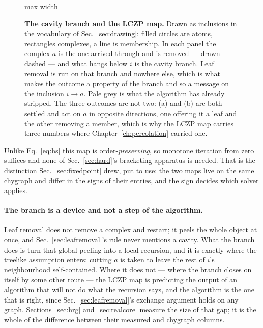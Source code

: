 \begin{figure}[t]
\begin{adjustbox}{max width=\linewidth}
\end{adjustbox}
\caption{\textbf{The cavity branch and the LCZP map.} Drawn
as inclusions in the vocabulary of Sec.~\ref{sec:drawing}: filled circles are
atoms, rectangles complexes, a line is membership. In each panel the complex
$a$ is the one arrived through and is removed --- drawn dashed --- and what
hangs below $i$ is the cavity branch. Leaf removal is run on that branch and
nowhere else, which is what makes the outcome a property of the branch and so a
message on the inclusion $i\to a$. Pale grey is what the algorithm has already
stripped. The three outcomes are not two: (a) and (b) are both settled and act
on $a$ in opposite directions, one offering it a leaf and the other removing a
member, which is why the LCZP map carries three numbers where
Chapter~\ref{ch:percolation} carried one.}
\label{fig:cavitybranch}
\end{figure}

Unlike Eq.~\eqref{eq:hs} this map is order-\emph{preserving}, so monotone
iteration from zero suffices and none of Sec.~\ref{sec:hard}'s bracketing
apparatus is needed. That is the distinction Sec.~\ref{sec:fixedpoint} drew, put
to use: the two maps live on the same chygraph and differ in the signs of their
entries, and the sign decides which solver applies.

\paragraph{The branch is a device and not a step of the algorithm.} Leaf removal
does not remove a complex and restart; it peels the whole object at once, and
Sec.~\ref{sec:leafremoval}'s rule never mentions a cavity. What the branch does
is turn that global peeling into a local recursion, and it is exactly where the
treelike assumption enters: cutting $a$ is taken to leave the rest of $i$'s
neighbourhood self-contained. Where it does not --- where the branch closes on
itself by some other route --- the LCZP map is predicting the output of an
algorithm that will not do what the recursion says, and the algorithm is the one
that is right, since Sec.~\ref{sec:leafremoval}'s exchange argument holds on any
graph. Sections~\ref{sec:hrg} and~\ref{sec:realcore} measure the size of that
gap; it is the whole of the difference between their measured and chygraph
columns.

